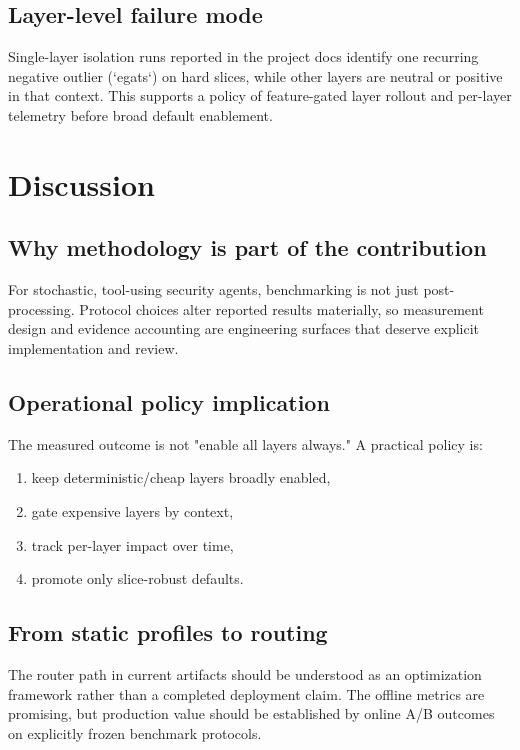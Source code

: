\documentclass[11pt]{article}
\begin{document}
\subsection{Layer-level failure mode}

Single-layer isolation runs reported in the project docs identify one recurring
negative outlier (`egats`) on hard slices, while other layers are neutral or
positive in that context. This supports a policy of feature-gated layer rollout
and per-layer telemetry before broad default enablement.

\section{Discussion}

\subsection{Why methodology is part of the contribution}

For stochastic, tool-using security agents, benchmarking is not just
post-processing. Protocol choices alter reported results materially, so
measurement design and evidence accounting are engineering surfaces that deserve
explicit implementation and review.

\subsection{Operational policy implication}

The measured outcome is not "enable all layers always." A practical policy is:

\begin{enumerate}[leftmargin=*]
  \item keep deterministic/cheap layers broadly enabled,
  \item gate expensive layers by context,
  \item track per-layer impact over time,
  \item promote only slice-robust defaults.
\end{enumerate}

\subsection{From static profiles to routing}

The router path in current artifacts should be understood as an optimization
framework rather than a completed deployment claim. The offline metrics are
promising, but production value should be established by online A/B outcomes on
explicitly frozen benchmark protocols.
\end{document}
